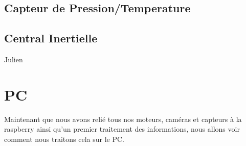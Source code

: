\documentclass[a4paper,11pt]{report}
\begin{document}
		\subsection{Capteur de Pression/Temperature}
		
		\subsection{Central Inertielle}
		Julien
		\newpage
	\section{PC}
		Maintenant que nous avons relié tous nos moteurs, caméras et capteurs à la raspberry ainsi qu'un premier traitement des informations, nous allons voir comment nous traitons cela sur le PC.
		
\end{document}
